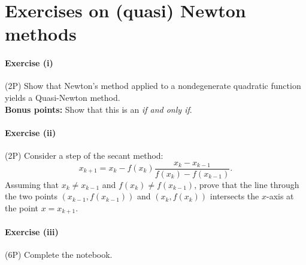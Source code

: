 \documentclass{scrartcl}
\begin{document}
\section*{Exercises on (quasi) Newton methods}

\paragraph{Exercise (i)} (2P) Show that Newton's method applied to a nondegenerate quadratic function yields a Quasi-Newton method.\\
\textbf{Bonus points:} Show that this is an \textit{if and only if}.

\paragraph{Exercise (ii)} (2P) Consider a step of the secant method:
        \begin{equation}
          x_{k+1} = x_k - f(x_k)\frac{x_k-x_{k-1}}{f(x_k)-f(x_{k-1})}.
        \end{equation}
        Assuming that $x_k\neq x_{k-1}$ and $f(x_k)\neq f(x_{k-1})$, prove that the line through the two points $(x_{k-1}, f(x_{k-1}))$ and $(x_k, f(x_k))$ intersects the $x$-axis at the point $x=x_{k+1}$.
\paragraph{Exercise (iii)} (6P) Complete the notebook.
\end{document}
